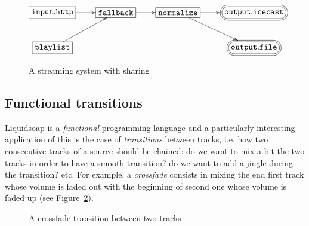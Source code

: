\documentclass{llncs}
\newcommand{\liquidsoap}{Liquidsoap}
\newcommand{\ie}{{i.e.}}
\newcommand{\fcaption}[1]{\vspace{-3ex}\caption{#1}\vspace{-4ex}}
\begin{document}
\begin{figure}[t]
 \begin{center}
\[
\xymatrix{
  *+[F]{\mathtt{input.http}}\ar[r]&*+[F]{\mathtt{fallback}}\ar[r]&
  *+[F]{\mathtt{normalize}}\ar[r]\ar[dr]&
  *+<10pt>[F=:<30pt>]{\mathtt{output.icecast}}\\
  *+[F]{\mathtt{playlist}}\ar[ur]& & & *+<10pt>[F=:<30pt>]{\mathtt{output.file}}\\
}
\]
\end{center}
\fcaption{A streaming system with sharing}
\label{fig:sharing}
\end{figure}

\subsection{Functional transitions}
\label{sec:transitions}

\liquidsoap{} is a \emph{functional} programming language and a particularly
interesting application of this is the case of \textit{transitions} between
tracks, \ie{} how two consecutive tracks of a source should be chained: do we
want to mix a bit the two tracks in order to have a smooth transition? do we
want to add a jingle during the transition? etc. For example, a \emph{crossfade}
consists in mixing the end first track whose volume is faded out with the
beginning of second one whose volume is faded up (see Figure~\ref{fig:cross}).
\vspace{-5ex}
\begin{figure}[h]
 \begin{center}
\end{center}
 \fcaption{A crossfade transition between two tracks}
 \label{fig:cross}
\end{figure}
\end{document}
